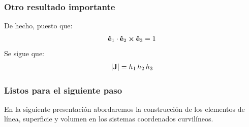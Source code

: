 \documentclass[12pt]{beamer}
\begin{document}
\begin{frame}
\frametitle{Otro resultado importante}
De hecho, puesto que:
\pause
\begin{align*}
\vu{e}_{1} \cdot \vu{e}_{2} \cp \vu{e}_{3} = 1
\end{align*}
\pause
Se sigue que:
\begin{align*}
\abs{\vb{J}} = h_{1} \, h_{2} \, h_{3}
\end{align*}
\end{frame}
\begin{frame}
\frametitle{Listos para el siguiente paso}
En la siguiente presentación abordaremos la construcción de los elementos de línea, superficie y volumen en los sistemas coordenados curvilíneos.
\end{frame}
\end{document}
